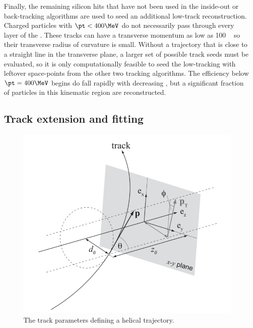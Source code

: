 Finally, the remaining silicon hits that have not been used in the inside-out or back-tracking algorithms are used to seed an additional low-\pt track reconstruction.
Charged particles with $\pt < 400 \MeV$ do not necessarily pass through every layer of the \sct.
These tracks can have a transverse momentum as low as 100 \MeV~ so their transverse radius of curvature is small.
Without a trajectory that is close to a straight line in the transverse plane, a larger set of possible track seeds must be evaluated, so it is only computationally feasible to seed the low-\pt tracking with leftover space-points from the other two tracking algorithms.
The efficiency below $\pt = 400 \MeV$ begins do fall rapidly with decreasing \pt, but a significant fraction of particles in this kinematic region are reconstructed.

\subsection{Track extension and fitting}

\begin{figure}[t]
  \includegraphics{track_schematic.png}
  \caption{The track parameters defining a helical trajectory.}
  \label{fig:trk_params}
\end{figure}

